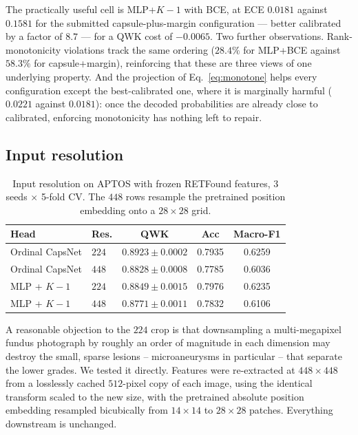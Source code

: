 \documentclass[journal]{IEEEtran}
\begin{document}
The practically useful cell is MLP+$K{-}1$ with BCE, at ECE $0.0181$ against $0.1581$ for the submitted capsule-plus-margin configuration --- better calibrated by a factor of $8.7$ --- for a QWK cost of $-0.0065$. Two further observations. Rank-monotonicity violations track the same ordering ($28.4\%$ for MLP+BCE against $58.3\%$ for capsule+margin), reinforcing that these are three views of one underlying property. And the projection of Eq.~\eqref{eq:monotone} helps every configuration except the best-calibrated one, where it is marginally harmful ($0.0221$ against $0.0181$): once the decoded probabilities are already close to calibrated, enforcing monotonicity has nothing left to repair.

\subsection{Input resolution}
\label{sec:resolution}
\begin{table}[!t]
\centering
\caption{Input resolution on APTOS with frozen RETFound features, 3 seeds $\times$ 5-fold CV. The $448$ rows resample the pretrained position embedding onto a $28{\times}28$ grid.}
\label{tab:resolution}
\begin{tabular}{llccc}
\toprule
Head & Res. & QWK & Acc & Macro-F1 \\
\midrule
Ordinal CapsNet & $224$ & $0.8923 \pm 0.0002$ & 0.7935 & 0.6259 \\
Ordinal CapsNet & $448$ & $0.8828 \pm 0.0008$ & 0.7785 & 0.6036 \\
\midrule
MLP + $K{-}1$ & $224$ & $0.8849 \pm 0.0015$ & 0.7976 & 0.6235 \\
MLP + $K{-}1$ & $448$ & $0.8771 \pm 0.0011$ & 0.7832 & 0.6106 \\
\bottomrule
\end{tabular}
\end{table}

A reasonable objection to the $224$ crop is that downsampling a multi-megapixel fundus photograph by roughly an order of magnitude in each dimension may destroy the small, sparse lesions -- microaneurysms in particular -- that separate the lower grades. We tested it directly. Features were re-extracted at $448{\times}448$ from a losslessly cached $512$-pixel copy of each image, using the identical transform scaled to the new size, with the pretrained absolute position embedding resampled bicubically from $14{\times}14$ to $28{\times}28$ patches. Everything downstream is unchanged.
\end{document}
